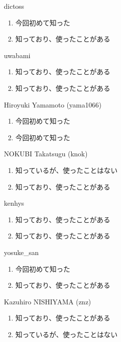 \begin{prework}{ dictoss }
  \begin{enumerate}
  \item 今回初めて知った
  \item 知っており、使ったことがある
  \end{enumerate}
\end{prework}

\begin{prework}{ uwabami }
  \begin{enumerate}
  \item 知っており、使ったことがある
  \item 知っており、使ったことがある
  \end{enumerate}
\end{prework}

\begin{prework}{ Hiroyuki Yamamoto (yama1066) }
  \begin{enumerate}
  \item 今回初めて知った
  \item 今回初めて知った
  \end{enumerate}
\end{prework}

\begin{prework}{ NOKUBI Takatsugu (knok) }
  \begin{enumerate}
  \item 知っているが、使ったことはない
  \item 知っており、使ったことがある
  \end{enumerate}
\end{prework}

\begin{prework}{ kenhys }
  \begin{enumerate}
  \item 知っており、使ったことがある
  \item 知っており、使ったことがある
  \end{enumerate}
\end{prework}

\begin{prework}{ yosuke\_san }
  \begin{enumerate}
  \item 今回初めて知った
  \item 知っており、使ったことがある
  \end{enumerate}
\end{prework}

\begin{prework}{ Kazuhiro NISHIYAMA (znz) }
  \begin{enumerate}
  \item 知っており、使ったことがある
  \item 知っているが、使ったことはない
  \end{enumerate}
\end{prework}

